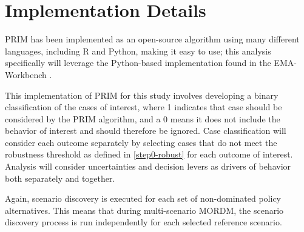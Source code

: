 
\section{Implementation Details} \label{step4-implementation}
PRIM has been implemented as an open-source algorithm using many different languages, including R and Python, making it easy to use; this analysis specifically will leverage the Python-based implementation found in the EMA-Workbench \citep{Kwakkel2016SD}.

This implementation of PRIM for this study involves developing a binary classification of the cases of interest, where 1 indicates that case should be considered by the PRIM algorithm, and a 0 means it does not include the behavior of interest and should therefore be ignored. Case classification will consider each outcome separately by selecting cases that do not meet the robustness threshold as defined in \cref{step0-robust} for each outcome of interest. Analysis will consider uncertainties and decision levers as drivers of behavior both separately and together.

Again, scenario discovery is executed for each set of non-dominated policy alternatives. This means that during multi-scenario MORDM, the scenario discovery process is run independently for each selected reference scenario. 
